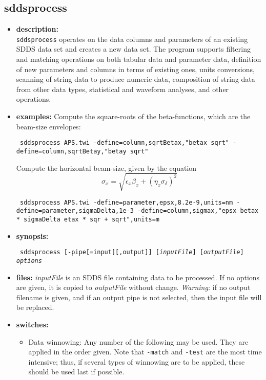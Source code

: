\newpage
\subsection{sddsprocess}
\label{sddsprocess}

\begin{itemize}
\item {\bf description:} \hspace*{1mm}\\
\verb|sddsprocess| operates on the data columns and parameters of an existing SDDS data set and creates a new
data set.  The program supports filtering and matching operations on both tabular data and parameter
data, definition of new parameters and columns in terms of existing ones, units conversions, scanning of 
string data to produce numeric data, composition of string data from other data types, 
statistical and waveform analyses, and other operations.
\item {\bf examples:}
Compute the square-roots of the beta-functions, which are the beam-size envelopes:
\begin{flushleft}{\tt
sddsprocess APS.twi -define=column,sqrtBetax,"betax sqrt"  -define=column,sqrtBetay,"betay sqrt" 
}\end{flushleft}
Compute the horizontal beam-size, given by the equation
\[ \sigma_x = \sqrt{ \epsilon_x \beta_x + (\eta_x \sigma_\delta)^2} \]
\begin{flushleft}{\tt
sddsprocess APS.twi -define=parameter,epsx,8.2e-9,units=nm -define=parameter,sigmaDelta,1e-3 
  -define=column,sigmax,"epsx betax *  sigmaDelta etax * sqr + sqrt",units=m
}\end{flushleft}
\item {\bf synopsis:} 
\begin{flushleft}{\tt
sddsprocess [-pipe[=input][,output]] [{\em inputFile}] [{\em outputFile}] {\em options}
}\end{flushleft}
\item {\bf files:}
{\em inputFile} is an SDDS file containing data to be processed.  If no options are given, it is copied to {\em
outputFile} without change.  {\em Warning:} if no output filename is given, and if an output pipe is not selected,
then the input file will be replaced.

\item {\bf switches:}
    \begin{itemize}
    \item Data winnowing: Any number of the following may be used.  They are applied in the order
given.  Note that {\tt -match} and {\tt -test} are the most time intensive; thus, if several types
of winnowing are to be applied, these should be used last if possible.


\end{itemize}
\end{itemize}

